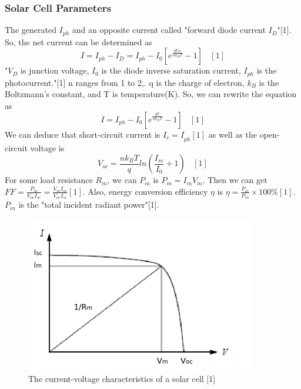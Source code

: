 \documentclass[12pt,a4paper]{article}
\begin{document}
\subsubsection{Solar Cell Parameters}
The generated $I_{ph}$ and an opposite current called "forward diode current ${I}_{D}$"[1]. So, the net current can be determined as
\begin{equation}
    {I=I}_{ph}-I_D=I_{ph}-I_0\left[e^\frac{qV_D}{nk_BT}-1\right]~~~~[1]
\end{equation}
"$V_D$ is junction voltage, $I_0$ is the diode inverse saturation current, $I_{ph}$ is the photocurrent."[1] n ranges from 1 to 2,. q is the charge of electron, $k_B$ is the Boltzmann’s constant, and T is temperature(K). So, we can rewrite the equation as
\begin{equation*}
    {I=I}_{ph}-I_0\left[e^\frac{qV}{nk_BT}-1\right]~~~~[1]
\end{equation*}
We can deduce that short-circuit current is ${I_c=I}_{ph}[1]$ as well as the open-circuit voltage is
\begin{equation*}
    V_{oc}=\frac{nk_BT}{q}ln(\frac{I_{sc}}{I_0}+1)~~~~[1]
\end{equation*}
For some load resistance $R_{m}$, we can  ${P}_m$ is $P_m=I_mV_m$. Then we can get $FF=\frac{P_m}{V_{oc}I_{sc}}=\frac{V_mI_m}{V_{oc}I_{sc}}[1]$. Also, energy conversion efficiency $\eta$ is  $\eta=\frac{P_m}{P_{in}}\times100\%[1]$.
$P_{in}$ is the "total incident radiant power"[1].
\begin{figure}[H]
    \centering
    \includegraphics[width=10cm]{characteristic.png}
    \caption{The current-voltage characteristics of a solar cell    [1]}
\end{figure}
\end{document}

